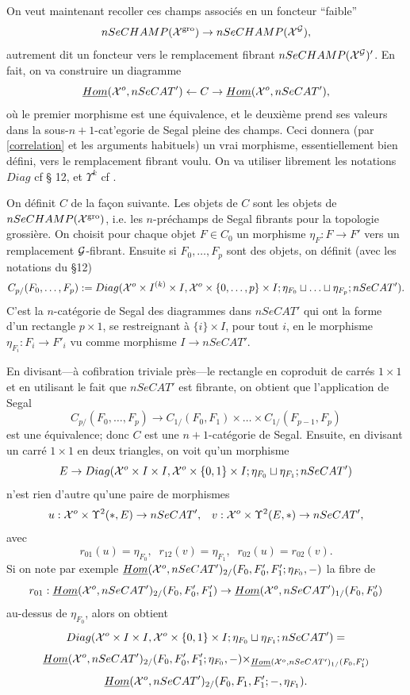 \documentclass[12pt]{article}
\newcommand{\Gg}{{\cal G}}
\newcommand{\Xx}{{\cal X}}
\begin{document}
On veut maintenant recoller ces champs associ\'es en un foncteur
``faible''
$$
nSeCHAMP(\Xx ^{\rm gro})\rightarrow nSeCHAMP(\Xx ^{\Gg}),
$$
autrement  dit un foncteur vers le remplacement fibrant
$nSeCHAMP(\Xx ^{\Gg})'$. En fait, on va construire un diagramme
$$
\underline{Hom}(\Xx ^o, nSeCAT')\leftarrow C\rightarrow
\underline{Hom}(\Xx ^o, nSeCAT'),
$$
o\`u le premier morphisme est une \'equivalence, et le deuxi\`eme
prend ses valeurs dans la
sous-$n+1$-cat'egorie de Segal pleine des champs. Ceci donnera  (par
\ref{correlation} et les arguments
habituels) un vrai morphisme,
essentiellement bien d\'efini, vers le remplacement fibrant voulu.
On va utiliser librement les notations $Diag$ cf \S
12, et $\Upsilon ^k$ cf \cite{limits}.

On d\'efinit $C$ de la fa\c{c}on suivante. Les objets de $C$ sont les objets de
\newline
$nSeCHAMP(\Xx ^{\rm gro})$, i.e. les $n$-pr\'echamps de Segal fibrants
pour la topologie grossi\`ere. On choisit pour chaque objet $F\in C_0$ un
morphisme
$\eta _F: F\rightarrow F'$ vers un remplacement $\Gg$-fibrant.
Ensuite si $F_0,\ldots ,
F_p$ sont des objets, on d\'efinit (avec les notations du \S 12)
$$
C_{p/}(F_0,\ldots , F_p):= Diag(\Xx ^o\times I^{(k)}\times I,
\Xx ^o\times \{ 0,\ldots , p\}
\times I;  \eta _{F_0}\sqcup \ldots \sqcup \eta _{F_p}; nSeCAT').
$$
C'est la $n$-cat\'egorie de Segal des diagrammes dans $nSeCAT'$ qui ont la forme
d'un rectangle $p\times 1$, se restreignant \`a $\{ i\} \times I$,
pour tout $i$,
en le morphisme $\eta _{F_i}: F_i\rightarrow F'_i$ vu comme
morphisme $I\rightarrow nSeCAT'$.

En divisant---\`a cofibration triviale pr\`es---le
rectangle en coproduit de carr\'es $1\times 1$ et en utilisant le fait que
$nSeCAT'$
est fibrante, on obtient que l'application de Segal
$$
C_{p/}(F_0,\ldots , F_p)\rightarrow
C_{1/}(F_0,F_1)\times \ldots \times C_{1/}(F_{p-1}, F_p)
$$
est une \'equivalence; donc $C$ est une $n+1$-cat\'egorie de Segal.
Ensuite, en divisant un carr\'e $1\times 1$ en deux triangles,
on voit qu'un morphisme
$$
E\rightarrow Diag(\Xx ^o\times I\times I,
\Xx ^o\times \{ 0,1\}\times I; \eta _{F_0}\sqcup \eta _{F_1};
nSeCAT')
$$
n'est rien d'autre qu'une paire de morphismes
$$
u: \Xx ^o\times \Upsilon ^2(\ast ,E)\rightarrow nSeCAT', \;\;\;
v: \Xx ^o\times \Upsilon  ^2(E,\ast )\rightarrow nSeCAT',
$$
avec
$$
r_{01}(u)=\eta _{F_0},\;\; r_{12}(v)= \eta _{F_1}, \;\; r_{02}(u)=r_{02}(v).
$$
Si on note par exemple $\underline{Hom}(\Xx ^o,nSeCAT')_{2/}(F_0, F'_0, F'_1;
\eta _{F_0},-)$ la fibre de
$$
r_{01}:\underline{Hom}(\Xx ^o,nSeCAT')_{2/}(F_0, F'_0, F'_1)\rightarrow
\underline{Hom}(\Xx ^o,nSeCAT')_{1/}(F_0, F'_0)
$$
au-dessus de $\eta _{F_0}$, alors on obtient
$$
Diag(\Xx ^o\times I\times I,
\Xx ^o\times \{ 0,1\}\times I; \eta _{F_0}\sqcup \eta _{F_1};
nSeCAT') =
$$
$$
\underline{Hom}(\Xx ^o,nSeCAT')_{2/}(F_0, F'_0, F'_1; \eta _{F_0},-)\times _{
\underline{Hom}(\Xx ^o,nSeCAT')_{1/}(F_0,  F'_1)}
$$
$$
\underline{Hom}(\Xx ^o,nSeCAT')_{2/}(F_0, F_1, F'_1; -,\eta _{F_1}).
$$
\end{document}
